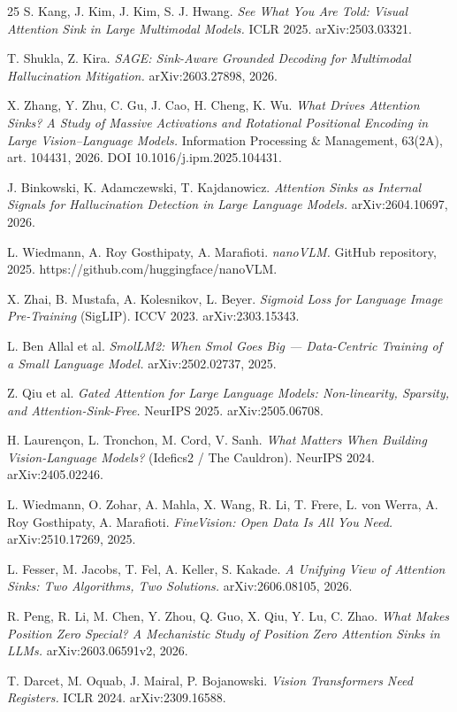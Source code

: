 \documentclass{article}
\begin{document}
\begin{thebibliography}{25}
S. Kang, J. Kim, J. Kim, S. J. Hwang. \textit{See What You Are Told: Visual Attention Sink in Large Multimodal Models.} ICLR 2025. arXiv:2503.03321.

T. Shukla, Z. Kira. \textit{SAGE: Sink-Aware Grounded Decoding for Multimodal Hallucination Mitigation.} arXiv:2603.27898, 2026.

X. Zhang, Y. Zhu, C. Gu, J. Cao, H. Cheng, K. Wu. \textit{What Drives Attention Sinks? A Study of Massive Activations and Rotational Positional Encoding in Large Vision--Language Models.} Information Processing \& Management, 63(2A), art. 104431, 2026. DOI 10.1016/j.ipm.2025.104431.

J. Binkowski, K. Adamczewski, T. Kajdanowicz. \textit{Attention Sinks as Internal Signals for Hallucination Detection in Large Language Models.} arXiv:2604.10697, 2026.

L. Wiedmann, A. Roy Gosthipaty, A. Marafioti. \textit{nanoVLM.} GitHub repository, 2025. https://github.com/huggingface/nanoVLM.

X. Zhai, B. Mustafa, A. Kolesnikov, L. Beyer. \textit{Sigmoid Loss for Language Image Pre-Training} (SigLIP). ICCV 2023. arXiv:2303.15343.

L. Ben Allal et al. \textit{SmolLM2: When Smol Goes Big --- Data-Centric Training of a Small Language Model.} arXiv:2502.02737, 2025.

Z. Qiu et al. \textit{Gated Attention for Large Language Models: Non-linearity, Sparsity, and Attention-Sink-Free.} NeurIPS 2025. arXiv:2505.06708.

H. Lauren\c{c}on, L. Tronchon, M. Cord, V. Sanh. \textit{What Matters When Building Vision-Language Models?} (Idefics2 / The Cauldron). NeurIPS 2024. arXiv:2405.02246.

L. Wiedmann, O. Zohar, A. Mahla, X. Wang, R. Li, T. Frere, L. von Werra, A. Roy Gosthipaty, A. Marafioti. \textit{FineVision: Open Data Is All You Need.} arXiv:2510.17269, 2025.

L. Fesser, M. Jacobs, T. Fel, A. Keller, S. Kakade. \textit{A Unifying View of Attention Sinks: Two Algorithms, Two Solutions.} arXiv:2606.08105, 2026.

R. Peng, R. Li, M. Chen, Y. Zhou, Q. Guo, X. Qiu, Y. Lu, C. Zhao. \textit{What Makes Position Zero Special? A Mechanistic Study of Position Zero Attention Sinks in LLMs.} arXiv:2603.06591v2, 2026.

T. Darcet, M. Oquab, J. Mairal, P. Bojanowski. \textit{Vision Transformers Need Registers.} ICLR 2024. arXiv:2309.16588.

\end{thebibliography}
\normalsize
\end{document}
